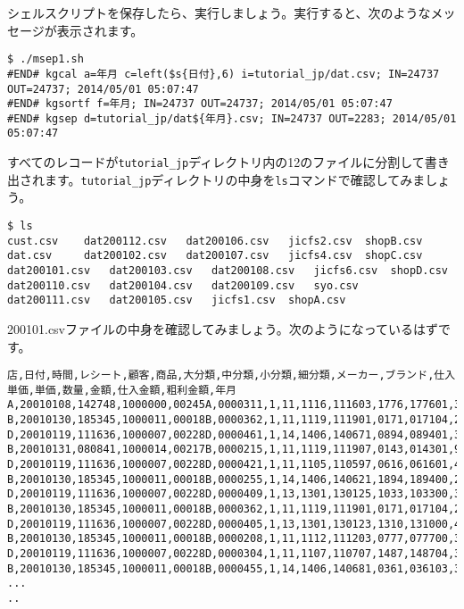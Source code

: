 シェルスクリプトを保存したら、実行しましょう。実行すると、次のようなメッセージが表示されます。

\begin{verbatim}
$ ./msep1.sh 
#END# kgcal a=年月 c=left($s{日付},6) i=tutorial_jp/dat.csv; IN=24737 OUT=24737; 2014/05/01 05:07:47
#END# kgsortf f=年月; IN=24737 OUT=24737; 2014/05/01 05:07:47
#END# kgsep d=tutorial_jp/dat${年月}.csv; IN=24737 OUT=2283; 2014/05/01 05:07:47
\end{verbatim}
 
すべてのレコードが\verb|tutorial_jp|ディレクトリ内の12のファイルに分割して書き出されます。\verb|tutorial_jp|ディレクトリの中身を\verb|ls|コマンドで確認してみましょう。

\begin{verbatim}
$ ls
cust.csv	dat200112.csv	dat200106.csv	jicfs2.csv	shopB.csv
dat.csv		dat200102.csv	dat200107.csv	jicfs4.csv	shopC.csv
dat200101.csv	dat200103.csv	dat200108.csv	jicfs6.csv	shopD.csv
dat200110.csv	dat200104.csv	dat200109.csv	syo.csv
dat200111.csv	dat200105.csv	jicfs1.csv	shopA.csv
\end{verbatim}

200101.csvファイルの中身を確認してみましょう。次のようになっているはずです。

\begin{verbatim}
店,日付,時間,レシート,顧客,商品,大分類,中分類,小分類,細分類,メーカー,ブランド,仕入単価,単価,数量,金額,仕入金額,粗利金額,年月
A,20010108,142748,1000000,00245A,0000311,1,11,1116,111603,1776,177601,339,441,1,441,339,102,200101
B,20010130,185345,1000011,00018B,0000362,1,11,1119,111901,0171,017104,222,289,1,289,222,67,200101
D,20010119,111636,1000007,00228D,0000461,1,14,1406,140671,0894,089401,381,496,1,496,381,115,200101
B,20010131,080841,1000014,00217B,0000215,1,11,1119,111907,0143,014301,99,129,7,903,693,210,200101
D,20010119,111636,1000007,00228D,0000421,1,11,1105,110597,0616,061601,412,536,6,3216,2472,744,200101
B,20010130,185345,1000011,00018B,0000255,1,14,1406,140621,1894,189400,256,333,1,333,256,77,200101
D,20010119,111636,1000007,00228D,0000409,1,13,1301,130125,1033,103300,333,433,6,2598,1998,600,200101
B,20010130,185345,1000011,00018B,0000362,1,11,1119,111901,0171,017104,222,289,1,289,222,67,200101
D,20010119,111636,1000007,00228D,0000405,1,13,1301,130123,1310,131000,408,531,1,531,408,123,200101
B,20010130,185345,1000011,00018B,0000208,1,11,1112,111203,0777,077700,358,466,1,466,358,108,200101
D,20010119,111636,1000007,00228D,0000304,1,11,1107,110707,1487,148704,343,446,4,1784,1372,412,200101
B,20010130,185345,1000011,00018B,0000455,1,14,1406,140681,0361,036103,376,489,1,489,376,113,200101
...
..
\end{verbatim}

%
